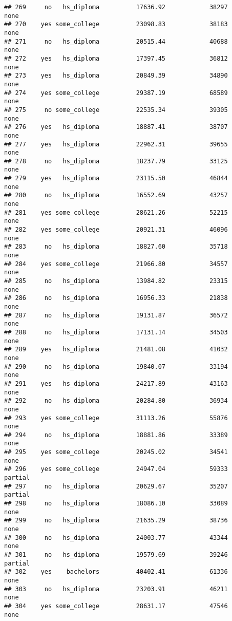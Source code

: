 \documentclass[
]{article}
\begin{document}
\begin{verbatim}
## 269     no   hs_diploma          17636.92            38297        none
## 270    yes some_college          23098.83            38183        none
## 271     no   hs_diploma          20515.44            40688        none
## 272    yes   hs_diploma          17397.45            36812        none
## 273    yes   hs_diploma          20849.39            34890        none
## 274    yes some_college          29387.19            68589        none
## 275     no some_college          22535.34            39305        none
## 276    yes   hs_diploma          18887.41            38707        none
## 277    yes   hs_diploma          22962.31            39655        none
## 278     no   hs_diploma          18237.79            33125        none
## 279    yes   hs_diploma          23115.50            46844        none
## 280     no   hs_diploma          16552.69            43257        none
## 281    yes some_college          28621.26            52215        none
## 282    yes some_college          20921.31            46096        none
## 283     no   hs_diploma          18827.60            35718        none
## 284    yes some_college          21966.80            34557        none
## 285     no   hs_diploma          13984.82            23315        none
## 286     no   hs_diploma          16956.33            21838        none
## 287     no   hs_diploma          19131.87            36572        none
## 288     no   hs_diploma          17131.14            34503        none
## 289    yes   hs_diploma          21481.08            41032        none
## 290     no   hs_diploma          19840.07            33194        none
## 291    yes   hs_diploma          24217.89            43163        none
## 292     no   hs_diploma          20284.80            36934        none
## 293    yes some_college          31113.26            55876        none
## 294     no   hs_diploma          18881.86            33389        none
## 295    yes some_college          20245.02            34541        none
## 296    yes some_college          24947.04            59333     partial
## 297     no   hs_diploma          20629.67            35207     partial
## 298     no   hs_diploma          18086.10            33089        none
## 299     no   hs_diploma          21635.29            38736        none
## 300     no   hs_diploma          24003.77            43344        none
## 301     no   hs_diploma          19579.69            39246     partial
## 302    yes    bachelors          40402.41            61336        none
## 303     no   hs_diploma          23203.91            46211        none
## 304    yes some_college          28631.17            47546        none

\end{verbatim}
\end{document}

